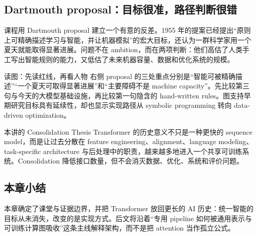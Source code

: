 \subsection{Dartmouth proposal：目标很准，路径判断很错}

课程用 Dartmouth proposal 建立一个有意的反差。1955 年的提案已经提出“原则上可精确描述学习与智能，并让机器模拟”的宏大目标，还认为一群科学家用一个夏天就能取得显著进展。问题不在 ambition，而在两项判断：他们高估了人类手工写出智能规则的能力，又低估了未来机器容量、数据和优化系统的规模。


\begin{knowledgebox}{读图：先读红线，再看人物}
右侧 proposal 的三处重点分别是“智能可被精确描述”“一个夏天可取得显著进展”和“主要障碍不是 machine capacity”。先比较第三句与今天的大模型基础设施，再比较第一句隐含的 hand-written rules。图支持早期研究目标具有延续性，却也显示实现路径从 symbolic programming 转向 data-driven optimization。
\end{knowledgebox}


\begin{importantbox}{本讲的 Consolidation Thesis}
Transformer 的历史意义不只是一种更快的 sequence model，而是让过去分散在 feature engineering、alignment、language modeling、task-specific architecture 与后处理中的职责，越来越多地进入一个共享可训练系统。Consolidation 降低接口数量，但不会消灭数据、优化、系统和评价问题。
\end{importantbox}

\subsection{本章小结}

本章确定了课堂与证据边界，并把 Transformer 放回更长的 AI 历史：统一智能的目标从未消失，改变的是实现方式。后文将沿着“专用 pipeline 如何被通用表示与可训练计算图吸收”这条主线解释架构，而不是把 attention 当作孤立公式。

